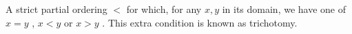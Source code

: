 A strict partial ordering  $ < $  for
which, for any  $ x,y $  in its domain, we have one of  $ x=y $ ,  $ x<y $  or
 $ x>y $ .  This extra condition is known as trichotomy.


